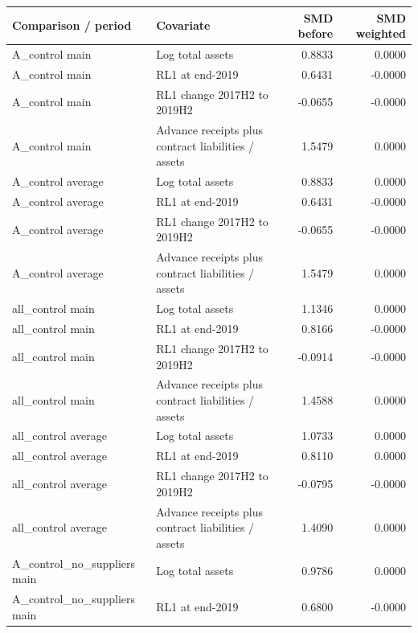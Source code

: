 \begingroup\small
\setlength{\tabcolsep}{3pt}
\begin{tabular}{lp{4.8cm}rr}
\toprule
Comparison / period & Covariate & SMD before & SMD weighted \\
\midrule
A\_control main & \raggedright Log total assets & 0.8833 & 0.0000 \\
A\_control main & \raggedright RL1 at end-2019 & 0.6431 & -0.0000 \\
A\_control main & \raggedright RL1 change 2017H2 to 2019H2 & -0.0655 & -0.0000 \\
A\_control main & \raggedright Advance receipts plus contract liabilities / assets & 1.5479 & 0.0000 \\
A\_control average & \raggedright Log total assets & 0.8833 & 0.0000 \\
A\_control average & \raggedright RL1 at end-2019 & 0.6431 & -0.0000 \\
A\_control average & \raggedright RL1 change 2017H2 to 2019H2 & -0.0655 & -0.0000 \\
A\_control average & \raggedright Advance receipts plus contract liabilities / assets & 1.5479 & 0.0000 \\
all\_control main & \raggedright Log total assets & 1.1346 & 0.0000 \\
all\_control main & \raggedright RL1 at end-2019 & 0.8166 & -0.0000 \\
all\_control main & \raggedright RL1 change 2017H2 to 2019H2 & -0.0914 & -0.0000 \\
all\_control main & \raggedright Advance receipts plus contract liabilities / assets & 1.4588 & 0.0000 \\
all\_control average & \raggedright Log total assets & 1.0733 & 0.0000 \\
all\_control average & \raggedright RL1 at end-2019 & 0.8110 & 0.0000 \\
all\_control average & \raggedright RL1 change 2017H2 to 2019H2 & -0.0795 & -0.0000 \\
all\_control average & \raggedright Advance receipts plus contract liabilities / assets & 1.4090 & 0.0000 \\
A\_control\_no\_suppliers main & \raggedright Log total assets & 0.9786 & 0.0000 \\
A\_control\_no\_suppliers main & \raggedright RL1 at end-2019 & 0.6800 & -0.0000 \\
\bottomrule
\end{tabular}
\par\medskip
